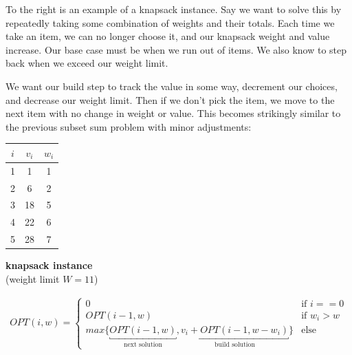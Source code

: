    \begin{minipage}{0.45\textwidth}

        To the right is an example of a knapsack instance. 
        Say we want to solve this by repeatedly taking some combination of weights and their totals.
        Each time we take an item, we can no longer choose it, and our knapsack weight and value increase.
        Our base case must be when we run out of items. We also know to step back when we exceed our weight limit.
        
        We want our build step to track the value in some way, decrement our choices, and decrease our weight limit. Then 
        if we don't pick the item, we move to the next item with no change in weight or value.
        This becomes strikingly similar to the previous subset sum problem with minor adjustments:

    \end{minipage}
    \begin{minipage}{0.45\textwidth}
        \begin{center}
            \begin{tabular}{|c|c|c|}
            \hline
            $i$ & $v_i$ & $w_i$ \\
            \hline
            1 & 1 & 1 \\
            2 & 6 & 2 \\
            3 & 18 & 5 \\
            4 & 22 & 6 \\
            5 & 28 & 7 \\
            \hline
            \end{tabular}
            
            \vspace{0.3cm}
            \textbf{knapsack instance} \\
            (weight limit $W = 11$)
        \end{center}
    \end{minipage}
    \begin{align*}
        OPT(i, w) =
        \begin{cases}
            0 & \text{if $i==0$}\\
            OPT(i-1, w) & \text{if $w_i > w$}\\
            max\{\underbracket{OPT(i-1, w)}_{\text{next solution}}, \underbracket{v_i+OPT(i-1, w-w_i)}_{\text{build solution}}\} & \text{else}
        \end{cases}
    \end{align*}
